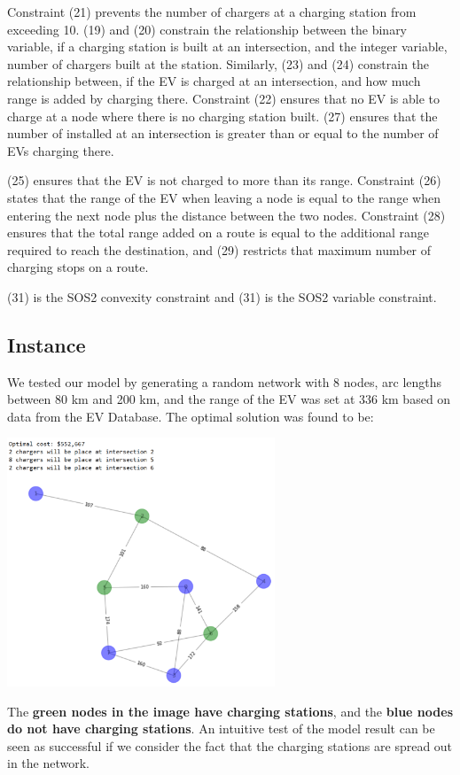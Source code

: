 \documentclass[12pt, fleqn]{article}
\begin{document}
\medskip

Constraint (21) prevents the number of chargers at a charging station from exceeding 10. (19) and (20) constrain the relationship between the binary variable, if a charging station is built at an intersection, and the integer variable, number of chargers built at the station. Similarly, (23) and (24) constrain the relationship between, if the EV is charged at an intersection, and how much range is added by charging there. Constraint (22) ensures that no EV is able to charge at a node where there is no charging station built. (27) ensures that the number of installed at an intersection is greater than or equal to the number of EVs charging there.

(25) ensures that the EV is not charged to more than its range. Constraint (26) states that the range of the EV when leaving a node is equal to the range when entering the next node plus the distance between the two nodes. Constraint (28) ensures that the total range added on a route is equal to the additional range required to reach the destination, and (29) restricts that maximum number of charging stops on a route.

(31) is the SOS2 convexity constraint and (31) is the SOS2 variable constraint.


\subsection{Instance}

We tested our model by generating a random network with 8 nodes, arc lengths between 80 km and 200 km, and the range of the EV was set at 336 km based on data from the EV Database. The optimal solution was found to be:
\begin{center}
    \includegraphics[width=0.6\textwidth]{model-instance.png}
\end{center}
The \textbf{green nodes in the image have charging stations}, and the \textbf{blue nodes do not have charging stations}.
An intuitive test of the model result can be seen as successful
if we consider the fact that the charging stations are spread out in the network.
\end{document}
